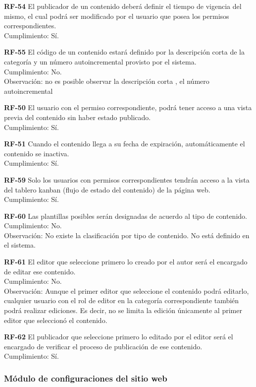 \documentclass[10pt,times,twocolumn]{article}
\begin{document}
\noindent \textbf{RF-54} El publicador de un contenido deberá definir el tiempo de vigencia del mismo, el  cual podrá ser modificado por el usuario que posea los permisos correspondientes.\\
Cumplimiento: Sí.

\noindent \textbf{RF-55} El código de un contenido estará definido por la descripción corta de la categoría y un número autoincremental provisto por el sistema.\\
Cumplimiento: No.\\
Observación: no es posible observar la descripción corta , el número autoincremental

\noindent \textbf{RF-50} El usuario con el permiso correspondiente, podrá tener acceso a una vista previa del contenido sin haber estado publicado.\\
Cumplimiento: Sí.

\noindent \textbf{RF-51} Cuando el contenido llega a su fecha de expiración, automáticamente el contenido se inactiva.\\
Cumplimiento: Sí.

\noindent \textbf{RF-59} Solo los usuarios con permisos correspondientes tendrán acceso a la vista  del tablero kanban (flujo de estado del contenido) de la página web.\\
Cumplimiento: Sí.

\noindent \textbf{RF-60} Las plantillas posibles serán designadas de acuerdo al tipo de contenido.\\
Cumplimiento: No.\\
Observación: No existe la clasificación por tipo de contenido. No está definido en el sistema.

\noindent \textbf{RF-61} El editor que seleccione primero lo creado por el autor será el encargado de editar ese contenido.\\
Cumplimiento: No.\\
Observación: Aunque el primer editor que seleccione el contenido podrá editarlo, cualquier usuario con el rol de editor en la categoría correspondiente también podrá realizar ediciones. Es decir, no se limita la edición únicamente al primer editor que seleccionó el contenido.

\noindent \textbf{RF-62} El publicador que seleccione primero lo editado por el editor será el encargado de verificar el proceso de publicación de ese contenido.\\
Cumplimiento: Sí.

\subsubsection{Módulo de configuraciones del sitio web}
\end{document}
